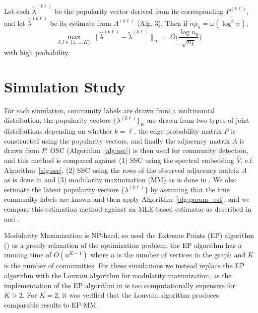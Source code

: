 \documentclass[12pt]{article}
\begin{document}
\begin{theorem}
\label{theorem6}
Let each $\tilde{\lambda}^{(k \ell)}$ be the popularity vector derived from its corresponding $P^{(k \ell)}$, and let $\hat{\lambda}^{(k \ell)}$ be its estimate from $A^{(k \ell)}$ (Alg. 3). Then if $n \rho_n = \omega( \log^{4}{n})$,
\begin{equation} \label{eq:thm6}
\max_{k, l \in \{1, ..., K\}} 
\|\hat{\lambda}^{(k \ell)} - \tilde{\lambda}^{(k \ell)}\|_{\infty} = 
O\bigg(\frac{\log n_k}{\sqrt{n_k}} \bigg)
\end{equation}
with high probability.
\end{theorem}

\hypertarget{simulated-examples}{%
\section{Simulation Study}\label{simulated-examples}}

For each simulation, community labels are drawn from a multinomial
distribution, the popularity vectors \(\{\lambda^{(k \ell)}\}_K\) are drawn
from two types of joint distributions depending on whether \(k = \ell\),
the edge probability matrix \(P\) is constructed using the popularity
vectors, and finally the adjacency matrix \(A\)
is drawn from \(P\). OSC (Algorithm~\ref{alg:osc}) is then used for community detection, and this
method is compared against (1) SSC using the spectral embedding $\hat{V}$,
c.f. Algorithm~\ref{alg:ssc}, (2) SSC using the rows of the
observed adjacency matrix $A$ as is done in \citet{noroozi2019estimation}
and (3) modularity maximization (MM) as is done in
\citet{307cbeb9b1be48299388437423d94bf1}. 
We also estimate the latent popularity vectors $\{\lambda^{(k \ell)}\}$
by assuming that the true community labels are known and then apply
Algorithm~\ref{alg:param_est}, and we compare this estimation method against an
MLE-based estimator as described in \citet{noroozi2019estimation} and
\citet{307cbeb9b1be48299388437423d94bf1}.

Modularity Maximization is NP-hard, so
\citet{307cbeb9b1be48299388437423d94bf1} used the Extreme Points
(EP) algorithm (\cite{le2016}) as a greedy
relaxation of the optimization problem; the EP algorithm has a running
time of $O(n^{K-1})$ where $n$ is the number of vertices in the graph
and $K$ is the number of communities.
For these simulations we instead replace the EP algorithm with the
Louvain algorithm for modularity maximization,
as the implementation of the EP algorithm in
\citet{307cbeb9b1be48299388437423d94bf1} is too computationally expensive for \(K > 2\). For \(K = 2\), it
was verified that the Louvain algorithm produces comparable results
to EP-MM.
\end{document}
